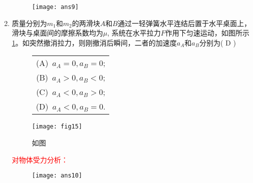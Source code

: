 \begin{enumerate}
\begin{note}
\begin{figure}[H]
            \centering
            \texttt{[image: ans9]}
        \end{figure}
    \end{note}
    \item 质量分别为$m_1$和$m_2$的两滑块$A$和$B$通过一轻弹簧水平连结后置于水平桌面上，滑块与桌面间的摩擦系数均为$\mu$, 系统在水平拉力$F$作用下匀速运动，如图所示\ref{Fig:15}。如突然撤消拉力，则刚撤消后瞬间，二者的加速度$a_A$和$a_B$分别为( D ) 
    \begin{figure}[ht]
        \begin{minipage}[ht]{0.4\linewidth}
           \begin{table}[H]
               \begin{tabular}{c}
                  \qquad   (A)\ $a_A=0, a_B=0$;\\
                  \qquad  (B)\ $a_A>0, a_B<0$;\\
                  \qquad  (C)\ $a_A<0, a_B>0$;\\
                  \qquad  (D)\ $a_A<0, a_B=0$.
               \end{tabular}
           \end{table}
        \end{minipage}
        \begin{minipage}[H]{0.5\linewidth}
            \texttt{[image: fig15]}
            \caption{如图}\label{Fig:15}
        \end{minipage}
    \end{figure}
    \begin{note}
        \textcolor{red}{对物体受力分析： }
        \begin{figure}[H]
            \centering
            \texttt{[image: ans10]}
        \end{figure}
    \end{note}
\end{enumerate}
